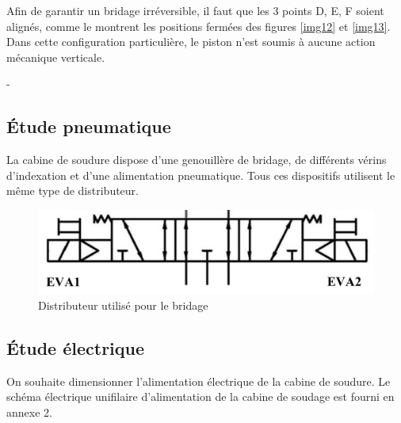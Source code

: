 


Afin de garantir un bridage irréversible, il faut que les 3 points D, E, F soient alignés, comme le montrent les positions fermées des figures \ref{img12} et \ref{img13}. Dans cette configuration particulière, le piston n’est soumis à aucune action mécanique verticale.

-
\subsection{Étude pneumatique}

La cabine de soudure dispose d’une genouillère de bridage, de différents vérins d’indexation et d’une alimentation pneumatique. Tous ces dispositifs utilisent le même type de distributeur.

\begin{figure}[!h]
\centering\includegraphics[width=0.4\linewidth]{img/fig14}
 \caption{Distributeur utilisé pour le bridage}
 \label{img14}
\end{figure}



\subsection{Étude électrique}

On souhaite dimensionner l’alimentation électrique de la cabine de soudure. Le schéma électrique unifilaire d’alimentation de la cabine de soudage est fourni en annexe 2.

